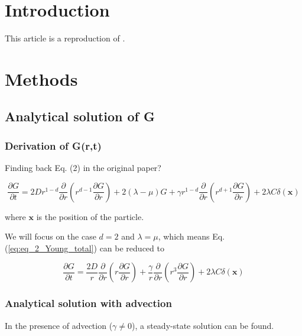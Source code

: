 
\section*{Introduction}
This article is a reproduction of \cite{young_reproductive_2001}.

\section*{Methods}

\subsection*{Analytical solution of G}
\subsubsection*{Derivation of G(r,t)}

Finding back Eq. (2) in the original paper?

\begin{equation}
\frac{\partial G}{\partial t}=2Dr^{1-d}\frac{\partial}{\partial r}\left(r^{d-1}\frac{\partial G}{\partial r}\right)+2(\lambda-\mu)G+\gamma r^{1-d}\frac{\partial}{\partial r}\left(r^{d+1}\frac{\partial G}{\partial r}\right)+2\lambda C\delta(\boldsymbol{x})\label{eq:eq_2_Young_total}
\end{equation}

where $\boldsymbol{x}$ is the position of the particle.

We will focus on the case $d=2$ and $\lambda=\mu$, which means Eq.
(\ref{eq:eq_2_Young_total}) can be reduced to

\begin{equation}
\frac{\partial G}{\partial t}=\frac{2D}{r}\frac{\partial}{\partial r}\left(r\frac{\partial G}{\partial r}\right)+\frac{\gamma}{r}\frac{\partial}{\partial r}\left(r^{3}\frac{\partial G}{\partial r}\right)+2\lambda C\delta(\boldsymbol{x})\label{eq:eq_2_Young_reduced}
\end{equation}


\subsubsection*{Analytical solution with advection}

In the presence of advection ($\gamma\neq0$), a steady-state solution
can be found. 

